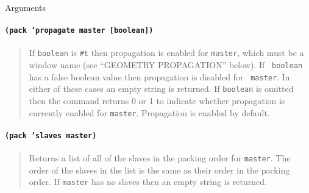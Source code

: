\begin{schemedoc}{Arguments}
\paragraph{\tt (pack 'propagate master [boolean])}
\begin{quote}
If {\tt boolean} is {\tt \#t} then propagation is enabled for {\tt master},
which must be a window name (see ``GEOMETRY PROPAGATION'' below).  If {\tt
boolean} has a false boolean value then propagation is disabled for {\tt
master}.  In either of these cases an empty string is returned.  If {\tt boolean}
is omitted then the command returns 0 or 1 to indicate whether propagation
is currently enabled for {\tt master}.  Propagation is enabled by default.
\end{quote}

\paragraph{\tt (pack 'slaves master)}
\begin{quote}
Returns a list of all of the slaves in the packing order for {\tt master}.
The order of the slaves in the list is the same as their order in the
packing order.  If {\tt master} has no slaves then an empty string is
returned.
\end{quote}
\end{schemedoc}

